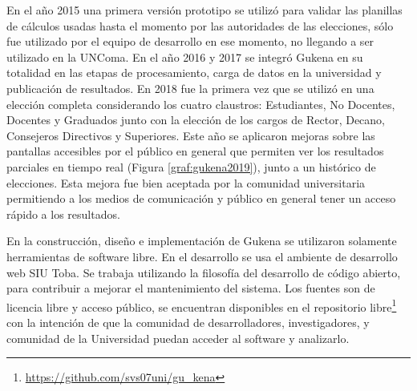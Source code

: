 En el año 2015 una primera versión prototipo se utilizó para validar las planillas de cálculos usadas hasta el momento por las autoridades de las elecciones, sólo fue utilizado por el equipo de desarrollo en ese momento, no llegando a ser utilizado en la UNComa. En el año 2016 y 2017 se integró Gukena en su totalidad en las etapas de procesamiento, carga de datos en la universidad y publicación de resultados.  En 2018 fue la primera vez que se utilizó en una elección completa considerando los cuatro claustros: Estudiantes, No Docentes, Docentes y Graduados junto con la elección de los cargos de Rector, Decano, Consejeros Directivos y Superiores. Este año se aplicaron mejoras sobre las pantallas accesibles por el público en general que permiten ver los resultados parciales en tiempo real (Figura \ref{graf:gukena2019}), junto a un histórico de elecciones. Esta mejora fue bien aceptada por la comunidad universitaria permitiendo a los medios de comunicación y público en general tener un acceso rápido a los resultados.

En la construcción, diseño e implementación de Gukena se utilizaron solamente herramientas de software libre. En el desarrollo se usa el ambiente de desarrollo web SIU Toba.
Se trabaja utilizando la filosofía del desarrollo de código abierto, para contribuir a mejorar el mantenimiento del sistema. Los fuentes son de licencia libre y acceso público, se encuentran disponibles en el repositorio libre\footnote{\url{https://github.com/svs07uni/gu_kena}} 
con la intención  de que la comunidad de desarrolladores, investigadores, y comunidad de la Universidad puedan acceder al software y analizarlo.

